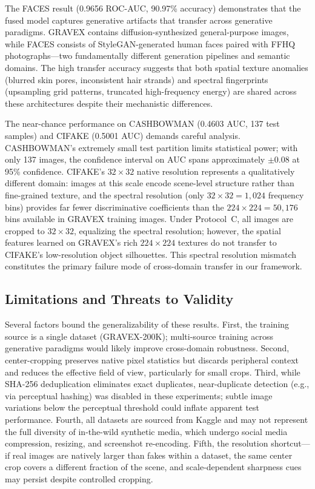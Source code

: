 \documentclass[conference]{IEEEtran}
\begin{document}
The FACES result (0.9656 ROC-AUC, 90.97\% accuracy) demonstrates that the fused model captures generative artifacts that transfer across generative paradigms. GRAVEX contains diffusion-synthesized general-purpose images, while FACES consists of StyleGAN-generated human faces paired with FFHQ photographs---two fundamentally different generation pipelines and semantic domains. The high transfer accuracy suggests that both spatial texture anomalies (blurred skin pores, inconsistent hair strands) and spectral fingerprints (upsampling grid patterns, truncated high-frequency energy) are shared across these architectures despite their mechanistic differences.

The near-chance performance on CASHBOWMAN (0.4603 AUC, 137 test samples) and CIFAKE (0.5001 AUC) demands careful analysis. CASHBOWMAN's extremely small test partition limits statistical power; with only 137 images, the confidence interval on AUC spans approximately $\pm 0.08$ at 95\% confidence. CIFAKE's $32{\times}32$ native resolution represents a qualitatively different domain: images at this scale encode scene-level structure rather than fine-grained texture, and the spectral resolution (only $32 \times 32 = 1{,}024$ frequency bins) provides far fewer discriminative coefficients than the $224 \times 224 = 50{,}176$ bins available in GRAVEX training images. Under Protocol~C, all images are cropped to $32{\times}32$, equalizing the spectral resolution; however, the spatial features learned on GRAVEX's rich $224{\times}224$ textures do not transfer to CIFAKE's low-resolution object silhouettes. This spectral resolution mismatch constitutes the primary failure mode of cross-domain transfer in our framework.

\subsection{Limitations and Threats to Validity}

Several factors bound the generalizability of these results. First, the training source is a single dataset (GRAVEX-200K); multi-source training across generative paradigms would likely improve cross-domain robustness. Second, center-cropping preserves native pixel statistics but discards peripheral context and reduces the effective field of view, particularly for small crops. Third, while SHA-256 deduplication eliminates exact duplicates, near-duplicate detection (e.g., via perceptual hashing) was disabled in these experiments; subtle image variations below the perceptual threshold could inflate apparent test performance. Fourth, all datasets are sourced from Kaggle and may not represent the full diversity of in-the-wild synthetic media, which undergo social media compression, resizing, and screenshot re-encoding. Fifth, the resolution shortcut---if real images are natively larger than fakes within a dataset, the same center crop covers a different fraction of the scene, and scale-dependent sharpness cues may persist despite controlled cropping.
\end{document}
